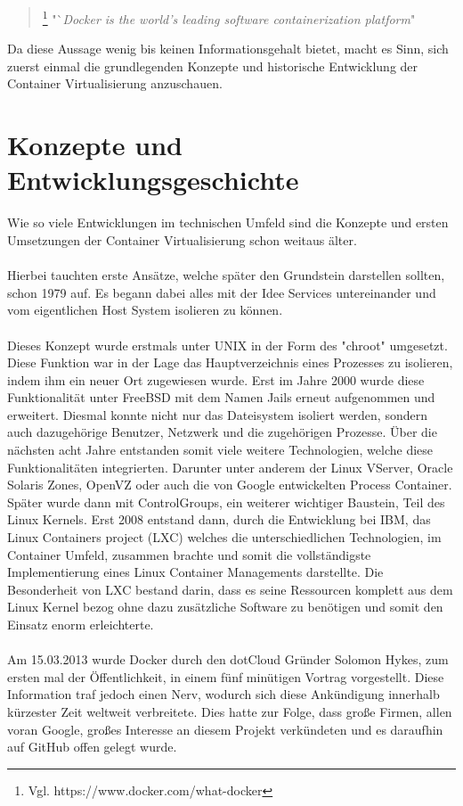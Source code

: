 \documentclass[12pt,toc=bib,toc=listof]{scrreprt}
\begin{document}
\begin{quote}
	\footnote[1]{Vgl. https://www.docker.com/what-docker}
	"`\textit{Docker is the world's leading software containerization platform}"
\end{quote}
Da diese Aussage wenig bis keinen Informationsgehalt bietet, macht es Sinn, sich zuerst einmal die grundlegenden Konzepte und historische Entwicklung der Container Virtualisierung anzuschauen. 

\section{Konzepte und Entwicklungsgeschichte}

Wie so viele Entwicklungen im technischen Umfeld sind die Konzepte und ersten Umsetzungen der Container Virtualisierung schon weitaus älter.\\
\\
Hierbei tauchten erste Ansätze, welche später den Grundstein darstellen sollten, schon 1979 auf.
Es begann dabei alles mit der Idee Services untereinander und vom eigentlichen Host System isolieren zu können.\\
\\
Dieses Konzept wurde erstmals unter UNIX in der Form des "chroot" umgesetzt.
Diese Funktion war in der Lage das Hauptverzeichnis eines Prozesses zu isolieren, indem ihm ein neuer Ort zugewiesen wurde. 
Erst im Jahre 2000 wurde diese Funktionalität unter FreeBSD mit dem Namen Jails erneut aufgenommen und erweitert.
Diesmal konnte nicht nur das Dateisystem isoliert werden, sondern auch dazugehörige Benutzer, Netzwerk und die zugehörigen Prozesse.
Über die nächsten acht Jahre entstanden somit viele weitere Technologien, welche diese Funktionalitäten integrierten. Darunter unter anderem der
Linux VServer, Oracle Solaris Zones, OpenVZ oder auch die von Google entwickelten Process Container.
Später wurde dann mit ControlGroups, ein weiterer wichtiger Baustein, Teil des Linux Kernels. 
Erst 2008 entstand dann, durch die Entwicklung bei IBM, das Linux Containers project (LXC) welches die unterschiedlichen Technologien, im Container Umfeld, zusammen brachte und somit die vollständigste Implementierung eines Linux Container Managements darstellte.
Die Besonderheit von LXC bestand darin, dass es seine Ressourcen komplett aus dem Linux Kernel bezog ohne dazu zusätzliche Software zu benötigen und somit den Einsatz enorm erleichterte.\\
\\
Am 15.03.2013 wurde Docker durch den dotCloud Gründer Solomon Hykes, zum ersten mal der Öffentlichkeit, in einem fünf minütigen Vortrag vorgestellt.
Diese Information traf jedoch einen Nerv, wodurch sich diese Ankündigung innerhalb kürzester Zeit weltweit verbreitete.
Dies hatte zur Folge, dass große Firmen, allen voran Google, großes Interesse an diesem Projekt verkündeten und es daraufhin auf GitHub offen gelegt wurde.
\end{document}
